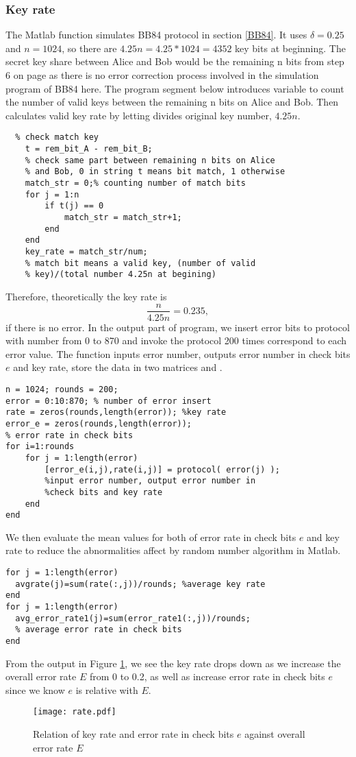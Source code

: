 \documentclass[12pt]{article}
\begin{document}
\subsubsection{Key rate}
The Matlab function  simulates BB84 protocol in section \ref{BB84}. It uses $\delta=0.25$ and $n=1024$, so there are $4.25n=4.25*1024=4352$ key bits at beginning. The secret key share between Alice and Bob would be the remaining n bits from step 6 on page \pageref{measurepage} as there is no error correction process involved in the simulation program of BB84 here. The program segment below introduces variable  to count the number of valid keys between the remaining n bits on Alice and Bob. Then calculates valid key rate by letting  divides original key number, $4.25n$. 
\begin{lstlisting}
  % check match key
    t = rem_bit_A - rem_bit_B;
    % check same part between remaining n bits on Alice
    % and Bob, 0 in string t means bit match, 1 otherwise
    match_str = 0;% counting number of match bits
    for j = 1:n
        if t(j) == 0
            match_str = match_str+1;
        end
    end
    key_rate = match_str/num;  
    % match bit means a valid key, (number of valid 
    % key)/(total number 4.25n at begining)
\end{lstlisting}
Therefore, theoretically the key rate is
\[
	\frac{n}{4.25n}=0.235,
\]
if there is no error.
In the output part of program, we insert error bits to protocol with number from $0$ to 870 and invoke the protocol 200 times correspond to each error value. The function  inputs error number, outputs error number in check bits $e$ and key rate, store the data in two matrices  and . 
\begin{lstlisting}
n = 1024; rounds = 200;
error = 0:10:870; % number of error insert
rate = zeros(rounds,length(error)); %key rate
error_e = zeros(rounds,length(error));
% error rate in check bits
for i=1:rounds
    for j = 1:length(error)
        [error_e(i,j),rate(i,j)] = protocol( error(j) );
        %input error number, output error number in 
        %check bits and key rate
    end
end
\end{lstlisting}
We then evaluate the mean values for both of error rate in check bits $e$ and key rate to reduce the abnormalities affect by random number algorithm in Matlab.
\begin{lstlisting}
for j = 1:length(error)
  avgrate(j)=sum(rate(:,j))/rounds; %average key rate
end
for j = 1:length(error)
  avg_error_rate1(j)=sum(error_rate1(:,j))/rounds; 
  % average error rate in check bits
end
\end{lstlisting}
From the output in Figure \ref{rateplot}, we see the key rate drops down as we increase the overall error rate $E$ from 0 to 0.2, as well as increase error rate in check bits $e$ since we know $e$ is relative with $E$. 
\begin{figure}[H]
\centering
\texttt{[image: rate.pdf]}
\caption{Relation of key rate and error rate in check bits $e$ against overall error rate $E$}\label{rateplot}
\end{figure}
\end{document}
